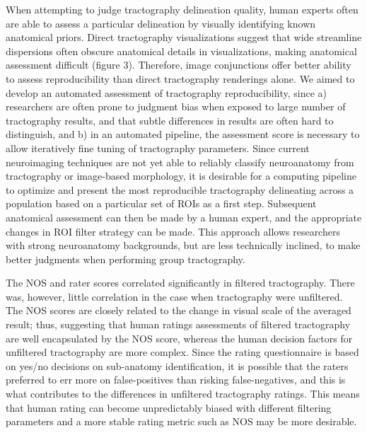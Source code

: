 When attempting to judge tractography delineation quality, human experts often are able to assess a particular delineation by visually identifying known anatomical priors. Direct tractography visualizations suggest that wide streamline dispersions often obscure anatomical details in visualizations, making anatomical assessment difficult (figure 3). Therefore, image conjunctions offer better ability to assess reproducibility than direct tractography renderings alone. We aimed to develop an automated assessment of tractography reproducibility, since a) researchers are often prone to judgment bias when exposed to large number of tractography results, and that subtle differences in results are often hard to distinguish, and b) in an automated pipeline, the assessment score is necessary to allow iteratively fine tuning of tractography parameters. Since current neuroimaging techniques are not yet able to reliably classify neuroanatomy from tractography or image-based morphology, it is desirable for a computing pipeline to optimize and present the most reproducible tractography delineating across a population based on a particular set of ROIs as a first step. Subsequent anatomical assessment can then be made by a human expert, and the appropriate changes in ROI filter strategy can be made. This approach allows researchers with strong neuroanatomy backgrounds, but are less technically inclined, to make better judgments when performing group tractography. 

The NOS and rater scores correlated significantly in filtered tractography. There was, however, little correlation in the case when tractography were unfiltered. The NOS scores are closely related to the change in visual scale of the averaged result; thus, suggesting that human ratings assessments of filtered tractography are well encapsulated by the NOS score, whereas the human decision factors for unfiltered tractography are more complex. Since the rating questionnaire is based on yes/no decisions on sub-anatomy identification, it is possible that the raters preferred to err more on false-positives than risking false-negatives, and this is what contributes to the differences in unfiltered tractography ratings. This means that human rating can become unpredictably biased with different filtering parameters and a more stable rating metric such as NOS may be more desirable.  

